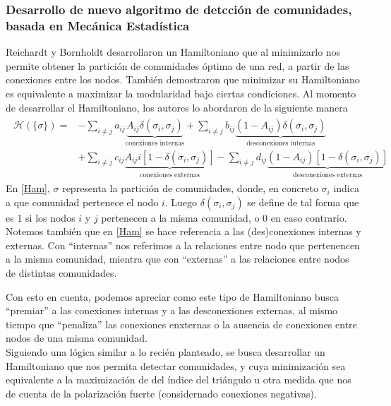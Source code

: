 \documentclass{proyectotesis}
\begin{document}
\subsubsection{Desarrollo de nuevo algoritmo de detcción de comunidades, basada en Mecánica Estadística} 
Reichardt y Bornholdt desarrollaron un Hamiltoniano que al minimizarlo nos permite obtener la partición de comunidades óptima de una red, a partir de las conexiones entre los nodos. También demostraron que minimizar su Hamiltoniano es equivalente a maximizar la modularidad bajo ciertas condiciones. 
Al momento de desarrollar el Hamiltoniano, los autores lo abordaron de la siguiente manera
\begin{align}
\begin{split}
    \mathcal{H}(\{\sigma\}) = &- \sum_{i\neq j} a_{ij}\underbrace{A_{ij}\delta(\sigma_i,\sigma_j)}_{\text{conexiones internas}} + \sum_{i\neq j} b_{ij}\underbrace{(1 - A_{ij})\delta(\sigma_i,\sigma_j)}_{\text{desconexiones internas}} \\
                              &+ \sum_{i\neq j} c_{ij} \underbrace{A_{ij}i[1 - \delta(\sigma_i,\sigma_j)] }_{\text{conexiones externas}} - \sum_{i\neq j} d_{ij} \underbrace{(1-A_{ij})[1 - \delta(\sigma_i,\sigma_j)]}_{\text{desconexiones externas}}
\end{split}
\label{Ham}
\end{align}
En \eqref{Ham}, $\sigma$ representa la partición de comunidades, donde, en concreto $\sigma_i$ indica a que comunidad pertenece el nodo $i$. Luego $\delta(\sigma_i,\sigma_j)$ se define de tal forma que es 1 si los nodos $i$ y $j$ pertenecen a la misma comunidad, o 0 en caso contrario. Notemos también que en \eqref{Ham} se hace referencia a las (des)conexiones internas y externas. Con ``internas'' nos referimos a la relaciones entre nodo que pertenencen a la misma comunidad, mientra que con ``externas'' a las relaciones entre nodos de distintas comunidades.

Con esto en cuenta, podemos apreciar como este tipo de Hamiltoniano busca ``premiar'' a las conexiones internas y a las desconexiones externas, al mismo tiempo que ``penaliza'' las conexiones enxternas o la ausencia de conexiones entre nodos de una misma comunidad.
\\

Siguiendo una lógica similar a lo recién planteado, se busca desarrollar un Hamiltoniano que nos permita detectar comunidades, y cuya minimización sea equivalente a la maximización de del índice del triángulo u otra medida que nos de cuenta de la polarización fuerte (considernado conexiones negativas).
\end{document}
